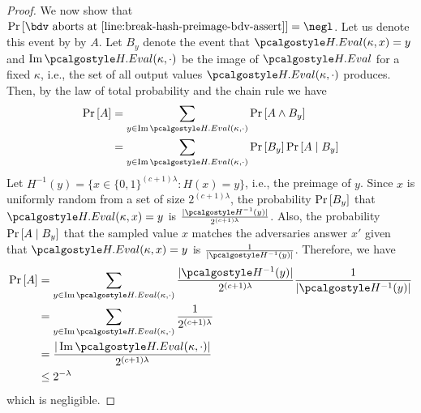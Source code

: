 \begin{proof}
  We now show that $\pr{\bdv \text{ aborts at \cref{line:break-hash-preimage-bdv-assert}} } = \negl$.
  Let us denote this event by by $A$.
  Let $B_y$ denote the event that $\algo{H.Eval}(\kappa, x) = y$ and $\Ima \algo{H.Eval}(\kappa, \cdot)$ be the image of $\algo{H.Eval}$ for a fixed $\kappa$, i.e., the set of all output values $\algo{H.Eval}(\kappa, \cdot)$ produces.
  Then, by the law of total probability and the chain rule we have
  \begin{align*}
    \pr{A} &= \sum_{y \in \Ima \algo{H.Eval}(\kappa, \cdot)} \pr{A \wedge B_y} \\
           &= \sum_{y \in \Ima \algo{H.Eval}(\kappa, \cdot)} \pr{B_y} \pr{A \mid B_y}
  \end{align*}
  Let $H^{-1}(y) = \{x \in \{0, 1\}^{(c+1)\lambda} : H(x) = y\}$, i.e., the preimage of $y$.
  Since $x$ is uniformly random from a set of size $2^{(c+1)\lambda}$, the probability $\Pr\left[ B_y \right]$ that $\algo{H.Eval}(\kappa, x) = y$ is $\frac{|\algo{H}^{-1}(y)|} {2^{(c+1)\lambda}}$.
  Also, the probability $\Pr\left[ A \mid B_y \right]$ that the sampled value $x$ matches the adversaries answer $x'$ given that $\algo{H.Eval}(\kappa, x) = y$ is $\frac{1}{|\algo{H}^{-1}(y)|}$.
  Therefore, we have
  \begin{align*}
    \pr{A} &= \sum_{y \in \Ima \algo{H.Eval}(\kappa, \cdot)} \frac{|\algo{H}^{-1}(y)|} {2^{(c+1)\lambda}} \frac{1}{|\algo{H}^{-1}(y)|}  \\
           &= \sum_{y \in \Ima \algo{H.Eval}(\kappa, \cdot)} \frac{1} {2^{(c+1)\lambda}} \\
           &= \frac{|\Ima \algo{H.Eval}(\kappa, \cdot)|} {2^{(c+1)\lambda}} \\
           &\le 2^{-\lambda} \\
  \end{align*}
  which is negligible.
\end{proof}
